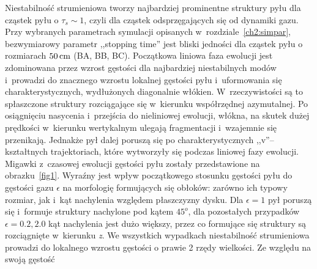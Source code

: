 Niestabilność strumieniowa tworzy najbardziej prominentne struktury pyłu dla
cząstek pyłu o $\tau_s \sim 1$, czyli dla cząstek odsprzęgających się od
dynamiki gazu.
Przy wybranych parametrach symulacji opisanych w~rozdziale~\ref{ch2:simpar},
bezwymiarowy parametr ,,stopping time'' jest bliski jedności dla cząstek pyłu o
rozmiarach $50\hbox{$\thinspace\textrm{cm}$}$ (BA, BB, BC). Początkowa liniowa faza ewolucji jest
zdominowana przez wzrost gęstości dla najbardziej niestabilnych modów i~prowadzi
do znacznego wzrostu lokalnej gęstości pyłu i~uformowania się
charakterystycznych, wydłużonych diagonalnie włókien. W~rzeczywistości są to
spłaszczone struktury rozciągające się w~kierunku współrzędnej azymutalnej. Po
osiągnięciu nasycenia i~przejścia do nieliniowej ewolucji, włókna, na skutek
dużej prędkości w~kierunku wertykalnym ulegają fragmentacji i~wzajemnie się
przenikają. Jednakże pył dalej poruszą się po charakterystycznych
,,v''--kształtnych trajektoriach, które wytworzyły się podczas liniowej fazy
ewolucji. Migawki z~czasowej ewolucji gęstości pyłu zostały przedstawione na
obrazku~\ref{fig1}. Wyraźny jest wpływ początkowego stosunku gęstości pyłu do
gęstości gazu $\epsilon$ na morfologię formujących się obłoków: zarówno ich
typowy rozmiar, jak i~kąt nachylenia względem płaszczyzny dysku. Dla $\epsilon =
1$ pył poruszą się i~formuje struktury nachylone pod kątem $45^o$, dla
pozostałych przypadków $\epsilon=0.2, 2.0$ kąt nachylenia jest dużo większy,
przez co formujące się struktury są rozciągnięte w~kierunku \emph{z}. We
wszystkich wypadkach niestabilność strumieniowa prowadzi do lokalnego wzrostu
gęstości o prawie 2 rzędy wielkości.  Ze względu na swoją gęstość

